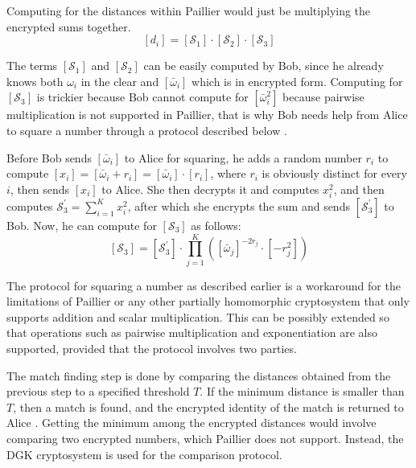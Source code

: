 Computing for the distances within Paillier would just be multiplying the encrypted sums together.
\[
\left[d_i\right] = \left[\mathcal{S}_1\right] \cdot \left[\mathcal{S}_2\right] \cdot \left[\mathcal{S}_3\right]
\]

The terms $\left[\mathcal{S}_1\right]$ and $\left[\mathcal{S}_2\right]$ can be easily computed by Bob, since he already knows both $\omega_i$ in the clear and $\left[\bar{\omega}_i\right]$ which is in encrypted form. Computing for $\left[\mathcal{S}_3\right]$ is trickier because Bob cannot compute for $\left[\bar{\omega}_i^2\right]$ because pairwise multiplication is not supported in Paillier, that is why Bob needs help from Alice to square a number through a protocol described below \cite{hutchison_privacy-preserving_2009-2}.

Before Bob sends $\left[\bar{\omega}_i\right]$ to Alice for squaring, he adds a random number $r_i$ to compute $\left[x_i\right] = \left[\bar{\omega}_i + r_i\right] = \left[\bar{\omega}_i\right] \cdot \left[r_i\right]$, where $r_i$ is obviously distinct for every $i$, then sends $\left[x_i\right]$ to Alice. She then decrypts it and computes $x_i^2$, and then computes $\mathcal{S}_3^\prime = \sum_{i=1}^{K} x_i^2$, after which she encrypts the sum and sends $\left[\mathcal{S}_3^\prime\right]$ to Bob. Now, he can compute for $\left[\mathcal{S}_3\right]$ as follows:
\[
\left[\mathcal{S}_3\right] = \left[\mathcal{S}_3^\prime\right] \cdot \prod_{j=1}^{K} \left(\left[\bar{\omega}_j\right]^{-2r_j} \cdot \left[-r_j^2\right]\right)
\]

The protocol for squaring a number as described earlier is a workaround for the limitations of Paillier or any other partially homomorphic cryptosystem that only supports addition and scalar multiplication. This can be possibly extended so that operations such as pairwise multiplication and exponentiation are also supported, provided that the protocol involves two parties.

The match finding step is done by comparing the distances obtained from the previous step to a specified threshold $T$. If the minimum distance is smaller than $T$, then a match is found, and the encrypted identity of the match is returned to Alice \cite{hutchison_privacy-preserving_2009-2}. Getting the minimum among the encrypted distances would involve comparing two encrypted numbers, which Paillier does not support. Instead, the DGK cryptosystem \cite{pieprzyk_efficient_2007} is used for the comparison protocol.
